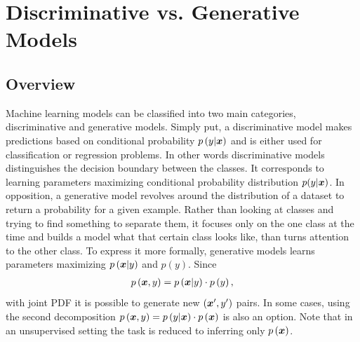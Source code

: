 
\chapter{Discriminative vs. Generative Models}\label{discriminative_modelinmg}
\section{Overview}
Machine learning models can be classified into two main categories, discriminative and generative models. Simply put, a discriminative model makes predictions based on conditional probability $p\left(y|\boldsymbol{x}\right)$ and is either used for classification or regression problems. In other words discriminative models distinguishes the decision boundary between the
classes.  It corresponds to learning parameters maximizing conditional probability
distribution $p(y|\boldsymbol{x})$. In opposition, a generative model revolves around the distribution of a dataset to return a probability for a given example. Rather than
looking at classes and trying to find something to separate them, it focuses
only on the one class at the time and builds a model what that certain class looks like, than turns attention to the other class. To express it more formally, generative models learns parameters maximizing $p\left(\boldsymbol{x}|y \right)$ and $p\left(y\right)$. Since
\begin{align}\label{eq:prob_decompostion}
p\left(\boldsymbol{x},y\right) = p\left(\boldsymbol{x}|y\right)\cdot p\left(y\right),
\end{align}
with joint PDF it is possible to generate new $\left(\boldsymbol{x}',y'\right)$ pairs. In some cases, using the second decomposition $p\left(\boldsymbol{x},y\right) = p\left(y|\boldsymbol{x}\right)\cdot p\left(\boldsymbol{x}\right)$ is also an option.  Note that in an unsupervised setting the task is reduced to inferring only $p\left(\boldsymbol{x}\right)$.
